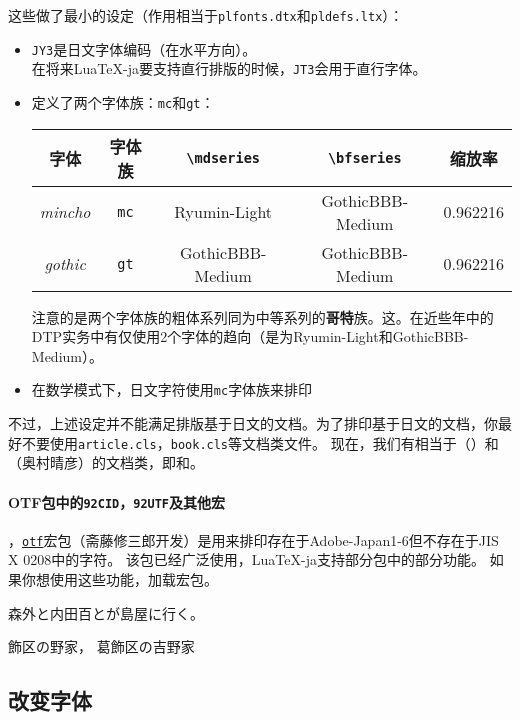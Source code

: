 \documentclass{ltjarticle}
\DeclareRobustCommand\LuaTeX{Lua\TeX}
\DeclareRobustCommand\pLaTeX{p\kern-.05em\LaTeX}
\begin{document}
这些做了最小的设定（作用相当于\verb!plfonts.dtx!和\verb!pldefs.ltx!）：
\begin{itemize}
\item \texttt{JY3}是日文字体编码（在水平方向）。\\
	在将来\LuaTeX-ja要支持直行排版的时候，\texttt{JT3}会用于直行字体。
\item 定义了两个字体族：\verb!mc!和\verb!gt!：\\
\begin{center}
	\begin{tabular}{ccccc}
	\hline
	\textbf{字体}&\textbf{字体族}&\verb!\mdseries!&\verb!\bfseries!&缩放率\\
	\hline
	\textit{mincho}&\verb!mc!&Ryumin-Light&GothicBBB-Medium&0.962216\\
	\textit{gothic}&\verb!gt!&GothicBBB-Medium&GothicBBB-Medium&0.962216\\
	\hline
	\end{tabular}
\end{center}
注意的是两个字体族的粗体系列同为中等系列的\textbf{哥特}族。这。在近些年中的DTP实务中有仅使用2个字体的趋向（是为Ryumin-Light和GothicBBB-Medium）。
\item 在数学模式下，日文字符使用\verb!mc!字体族来排印
\end{itemize}

不过，上述设定并不能满足排版基于日文的文档。为了排印基于日文的文档，你最好不要使用\texttt{article.cls}，\texttt{book.cls}等文档类文件。
现在，我们有相当于（）和（奥村晴彦）的文档类，即和。

\paragraph{OTF包中的\texttt{\char92CID}，\texttt{\char92UTF}及其他宏} ，\underline{\texttt{otf}}宏包（斋藤修三郎开发）是用来排印存在于Adobe-Japan1-6但不存在于JIS X 0208中的字符。
该包已经广泛使用，\LuaTeX-ja支持部分包中的部分功能。
如果你想使用这些功能，加载宏包。
\bgroup
\mincho
\begin{LTXexample}
森外と内田百とが島屋に行く。

飾区の野家，
葛飾区の吉野家
\end{LTXexample}
\egroup
\subsection{改变字体}
\end{document}
